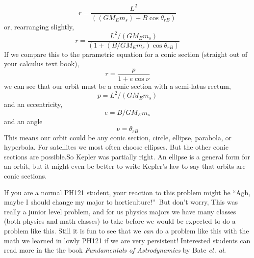 $$r=\frac{L^{2}}{\left( \left( GM_{E}m_{s}\right) +B\cos \theta _{rB}\right) } 
$$
or, rearranging slightly, 
$$r=\frac{L^{2}/\left( GM_{E}m_{s}\right) }{\left( 1+\left(B/GM_{E}m_{s}\right) \cos \theta _{rB}\right) } $$
If we compare this to the parametric equation for a conic section (straight out of your calculus text book), 
$$r=\frac{p}{1+e\cos \nu } $$
we can see that our orbit must be a conic section with a semi-latus rectum, 
$$p=L^{2}/\left( GM_{E}m_{s}\right) $$
and an eccentricity, 
$$e=B/GM_{E}m_{s}$$
and an angle 
$$\nu =\theta _{rB}$$
This means our orbit could be any conic section, circle, ellipse, parabola, or hyperbola. For satellites we most often choose ellipses. But the other conic sections are possible.So Kepler was partially right. An ellipse is a general form for an orbit, but it might even be better to write Kepler's law to say that orbits are conic sections.

If you are a normal PH121 student, your reaction to this problem might be \textquotedblleft Agh, maybe I should change my major to horticulture!\textquotedblright\ But don't worry, This was really a junior level problem, and for us physics majors we have many classes (both physics and math classes) to take before we would be expected to do a problem like this. Still it is fun to see that we \emph{can} do a problem like this with the math we learned in lowly PH121 if we are very persistent!  Interested students can read more in the the book \textit{Fundamentals of Astrodynamics} by Bate \textit{et. al.} \cite{Bate1971}\cite{ExplainingComputers2021}\cite{byuiphysics} \cite{Acquista76}


	
